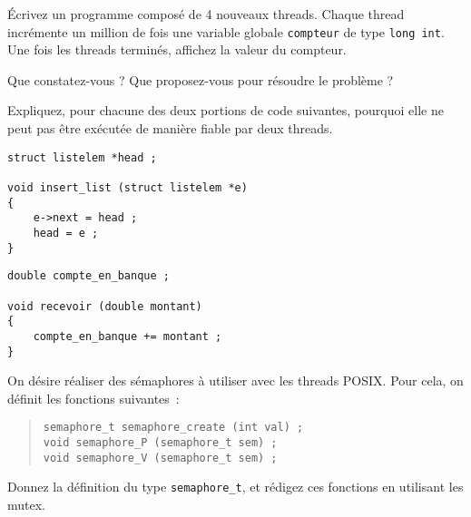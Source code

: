 \question	%

Écrivez un programme composé de 4 nouveaux threads. Chaque thread
incrémente un million de fois une variable globale \texttt {compteur}
de type \texttt {long int}. Une fois les threads terminés, affichez
la valeur du compteur.

Que constatez-vous ? Que proposez-vous pour résoudre le problème ?


\question

Expliquez, pour chacune des deux portions de code suivantes, pourquoi
elle ne peut pas être exécutée de manière fiable par deux threads.

\hfill
\begin {minipage} [t] {0.45\linewidth}
    \small
    \begin {verbatim}
struct listelem *head ;

void insert_list (struct listelem *e)
{
    e->next = head ;
    head = e ;
}
\end{verbatim}
\end {minipage}
\hfill
\begin {minipage} [t] {0.45\linewidth}
    \small
    \begin {verbatim}
double compte_en_banque ;

void recevoir (double montant)
{
    compte_en_banque += montant ;
}
\end{verbatim}
\end {minipage}


\question

On désire réaliser des sémaphores à utiliser avec les threads POSIX.
Pour cela, on définit les fonctions suivantes~:

\begin {quote}
\begin {verbatim}
semaphore_t semaphore_create (int val) ;
void semaphore_P (semaphore_t sem) ;
void semaphore_V (semaphore_t sem) ;
\end{verbatim}
\end {quote}

Donnez la définition du type \verb|semaphore_t|, et rédigez ces fonctions
en utilisant les mutex.
